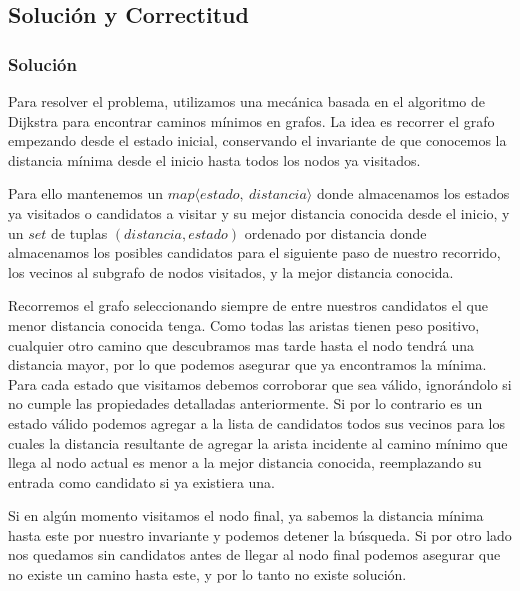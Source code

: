 

\subsection{Solución y Correctitud}
    \subsubsection{Solución}

    Para resolver el problema, utilizamos una mecánica basada en el algoritmo de Dijkstra para encontrar caminos mínimos en grafos. La idea es recorrer el grafo empezando desde el estado inicial, conservando el invariante de que conocemos la distancia mínima desde el inicio hasta todos los nodos ya visitados.

    Para ello mantenemos un $map\langle {estado,\ distancia} \rangle$ donde almacenamos los estados ya visitados o candidatos a visitar y su mejor distancia conocida desde el inicio, y un $set$ de tuplas $(distancia, estado)$ ordenado por distancia donde almacenamos los posibles candidatos para el siguiente paso de nuestro recorrido, los vecinos al subgrafo de nodos visitados, y la mejor distancia conocida.

    Recorremos el grafo seleccionando siempre de entre nuestros candidatos el que menor distancia conocida tenga. Como todas las aristas tienen peso positivo, cualquier otro camino que descubramos mas tarde hasta el nodo tendrá una distancia mayor, por lo que podemos asegurar que ya encontramos la mínima. Para cada estado que visitamos debemos corroborar que sea válido, ignorándolo si no cumple las propiedades detalladas anteriormente. Si por lo contrario es un estado válido podemos agregar a la lista de candidatos todos sus vecinos para los cuales la distancia resultante de agregar la arista incidente al camino mínimo que llega al nodo actual es menor a la mejor distancia conocida, reemplazando su entrada como candidato si ya existiera una.

    Si en algún momento visitamos el nodo final, ya sabemos la distancia mínima hasta este por nuestro invariante y podemos detener la búsqueda. Si por otro lado nos quedamos sin candidatos antes de llegar al nodo final podemos asegurar que no existe un camino hasta este, y por lo tanto no existe solución.
\\

